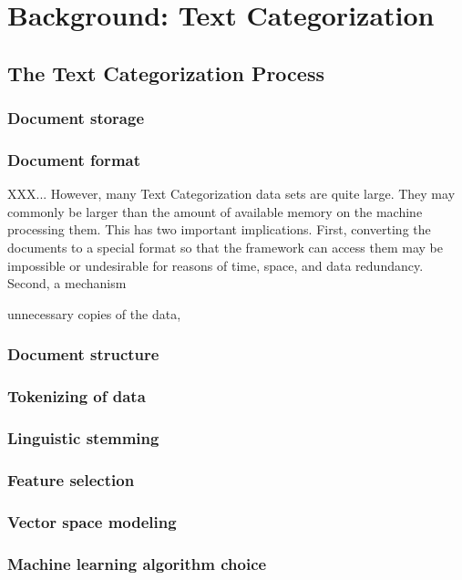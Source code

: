 
\chapter{Background: Text Categorization}

\section{The Text Categorization Process}
\subsection{Document storage}
\label{Document storage}

\subsection{Document format}
\label{Document format}

XXX... However, many Text Categorization data sets are quite large.  They may
commonly be larger than the amount of available memory on the machine
processing them.  This has two important implications.  First,
converting the documents to a special format so that the framework can
access them may be impossible or undesirable for reasons of time,
space, and data redundancy.  Second, a mechanism 

unnecessary copies of the data, 

\subsection{Document structure}
\subsection{Tokenizing of data}
\subsection{Linguistic stemming}
\subsection{Feature selection}
\subsection{Vector space modeling}
\subsection{Machine learning algorithm choice}
